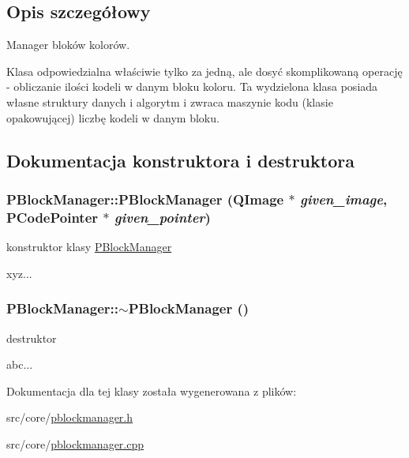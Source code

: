 \subsection{Opis szczegółowy}
Manager bloków kolorów. 

Klasa odpowiedzialna właściwie tylko za jedną, ale dosyć skomplikowaną operację - obliczanie ilości kodeli w danym bloku koloru. Ta wydzielona klasa posiada własne struktury danych i algorytm i zwraca maszynie kodu (klasie opakowującej) liczbę kodeli w danym bloku. 

\subsection{Dokumentacja konstruktora i destruktora}
\hypertarget{classPBlockManager_f5a95fca85a31c0257b38b57cbb3378a}{
\subsubsection[{PBlockManager}]{\setlength{\rightskip}{0pt plus 5cm}PBlockManager::PBlockManager (QImage $\ast$ {\em given\_\-image}, \/  {\bf PCodePointer} $\ast$ {\em given\_\-pointer})}}
\label{classPBlockManager_f5a95fca85a31c0257b38b57cbb3378a}


konstruktor klasy \hyperlink{classPBlockManager}{PBlockManager} 

xyz... \hypertarget{classPBlockManager_52d7abb7f858625e9e014fb555f571a6}{
\subsubsection[{$\sim$PBlockManager}]{\setlength{\rightskip}{0pt plus 5cm}PBlockManager::$\sim$PBlockManager ()}}
\label{classPBlockManager_52d7abb7f858625e9e014fb555f571a6}


destruktor 

abc... 

Dokumentacja dla tej klasy została wygenerowana z plików:\begin{CompactItemize}
\item 
src/core/\hyperlink{pblockmanager_8h}{pblockmanager.h}\item 
src/core/\hyperlink{pblockmanager_8cpp}{pblockmanager.cpp}\end{CompactItemize}
